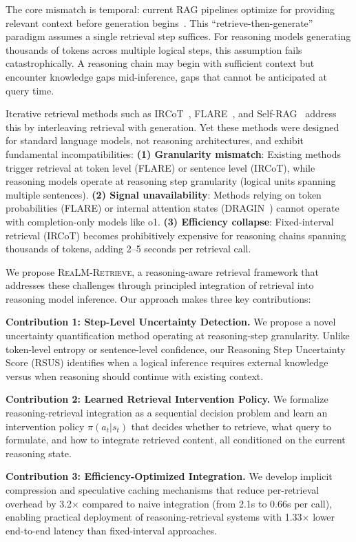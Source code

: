 \documentclass[sigconf,natbib=true]{acmart}
\newcommand{\methodname}{\textsc{ReaLM-Retrieve}}
\begin{document}
The core mismatch is temporal: current RAG pipelines optimize for providing relevant context before generation begins~\cite{gao2024ragsurvey, lewis2020rag}. This ``retrieve-then-generate'' paradigm assumes a single retrieval step suffices. For reasoning models generating thousands of tokens across multiple logical steps, this assumption fails catastrophically. A reasoning chain may begin with sufficient context but encounter knowledge gaps mid-inference, gaps that cannot be anticipated at query time.

Iterative retrieval methods such as IRCoT~\cite{trivedi2023ircot}, FLARE~\cite{jiang2023flare}, and Self-RAG~\cite{asai2024selfrag} address this by interleaving retrieval with generation. Yet these methods were designed for standard language models, not reasoning architectures, and exhibit fundamental incompatibilities: \textbf{(1) Granularity mismatch}: Existing methods trigger retrieval at token level (FLARE) or sentence level (IRCoT), while reasoning models operate at reasoning step granularity (logical units spanning multiple sentences). \textbf{(2) Signal unavailability}: Methods relying on token probabilities (FLARE) or internal attention states (DRAGIN~\cite{su2024dragin}) cannot operate with completion-only models like o1. \textbf{(3) Efficiency collapse}: Fixed-interval retrieval (IRCoT) becomes prohibitively expensive for reasoning chains spanning thousands of tokens, adding 2--5 seconds per retrieval call.

We propose \methodname{}, a reasoning-aware retrieval framework that addresses these challenges through principled integration of retrieval into reasoning model inference. Our approach makes three key contributions:

\textbf{Contribution 1: Step-Level Uncertainty Detection.} We propose a novel uncertainty quantification method operating at reasoning-step granularity. Unlike token-level entropy or sentence-level confidence, our Reasoning Step Uncertainty Score (RSUS) identifies when a logical inference requires external knowledge versus when reasoning should continue with existing context.

\textbf{Contribution 2: Learned Retrieval Intervention Policy.} We formalize reasoning-retrieval integration as a sequential decision problem and learn an intervention policy $\pi(a_t|s_t)$ that decides whether to retrieve, what query to formulate, and how to integrate retrieved content, all conditioned on the current reasoning state.

\textbf{Contribution 3: Efficiency-Optimized Integration.} We develop implicit compression and speculative caching mechanisms that reduce per-retrieval overhead by 3.2$\times$ compared to naive integration (from 2.1s to 0.66s per call), enabling practical deployment of reasoning-retrieval systems with 1.33$\times$ lower end-to-end latency than fixed-interval approaches.
\end{document}

